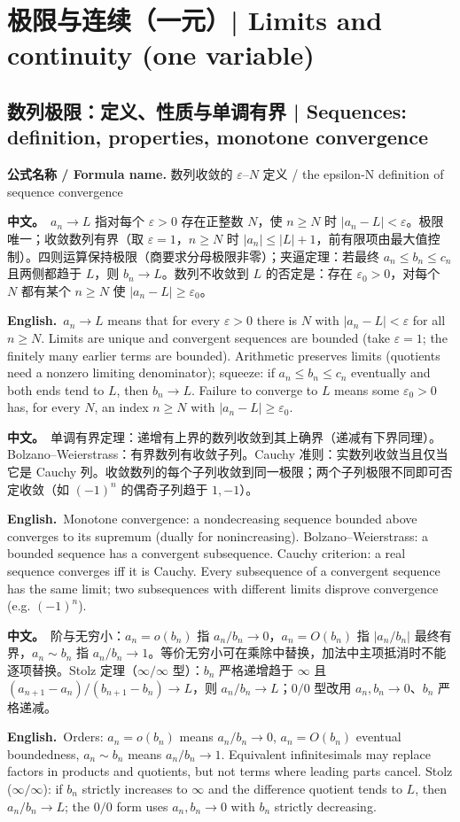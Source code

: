 \documentclass[UTF8,11pt,a4paper]{ctexart}
\newcommand{\BOTH}[2]{\par\noindent\textbf{中文。}\ #1\par\noindent\textbf{English.}\ #2\par}
\newcommand{\FORMULA}[2]{\par\noindent\textbf{公式名称 / Formula name.} #1 / #2\par}
\begin{document}
\section{极限与连续（一元）| Limits and continuity (one variable)}

\subsection{数列极限：定义、性质与单调有界 | Sequences: definition, properties, monotone convergence}
\FORMULA{数列收敛的 $\varepsilon$--$N$ 定义}{the epsilon-N definition of sequence convergence}
\BOTH{$a_n\to L$ 指对每个 $\varepsilon>0$ 存在正整数 $N$，使 $n\ge N$ 时 $|a_n-L|<\varepsilon$。极限唯一；收敛数列有界（取 $\varepsilon=1$，$n\ge N$ 时 $|a_n|\le|L|+1$，前有限项由最大值控制）。四则运算保持极限（商要求分母极限非零）；夹逼定理：若最终 $a_n\le b_n\le c_n$ 且两侧都趋于 $L$，则 $b_n\to L$。数列不收敛到 $L$ 的否定是：存在 $\varepsilon_0>0$，对每个 $N$ 都有某个 $n\ge N$ 使 $|a_n-L|\ge\varepsilon_0$。}{$a_n\to L$ means that for every $\varepsilon>0$ there is $N$ with $|a_n-L|<\varepsilon$ for all $n\ge N$. Limits are unique and convergent sequences are bounded (take $\varepsilon=1$; the finitely many earlier terms are bounded). Arithmetic preserves limits (quotients need a nonzero limiting denominator); squeeze: if $a_n\le b_n\le c_n$ eventually and both ends tend to $L$, then $b_n\to L$. Failure to converge to $L$ means some $\varepsilon_0>0$ has, for every $N$, an index $n\ge N$ with $|a_n-L|\ge\varepsilon_0$.}
\BOTH{单调有界定理：递增有上界的数列收敛到其上确界（递减有下界同理）。Bolzano--Weierstrass：有界数列有收敛子列。Cauchy 准则：实数列收敛当且仅当它是 Cauchy 列。收敛数列的每个子列收敛到同一极限；两个子列极限不同即可否定收敛（如 $(-1)^n$ 的偶奇子列趋于 $1,-1$）。}{Monotone convergence: a nondecreasing sequence bounded above converges to its supremum (dually for nonincreasing). Bolzano--Weierstrass: a bounded sequence has a convergent subsequence. Cauchy criterion: a real sequence converges iff it is Cauchy. Every subsequence of a convergent sequence has the same limit; two subsequences with different limits disprove convergence (e.g. $(-1)^n$).}
\BOTH{阶与无穷小：$a_n=o(b_n)$ 指 $a_n/b_n\to0$，$a_n=O(b_n)$ 指 $|a_n/b_n|$ 最终有界，$a_n\sim b_n$ 指 $a_n/b_n\to1$。等价无穷小可在乘除中替换，加法中主项抵消时不能逐项替换。Stolz 定理（$\infty/\infty$ 型）：$b_n$ 严格递增趋于 $\infty$ 且 $(a_{n+1}-a_n)/(b_{n+1}-b_n)\to L$，则 $a_n/b_n\to L$；$0/0$ 型改用 $a_n,b_n\to0$、$b_n$ 严格递减。}{Orders: $a_n=o(b_n)$ means $a_n/b_n\to0$, $a_n=O(b_n)$ eventual boundedness, $a_n\sim b_n$ means $a_n/b_n\to1$. Equivalent infinitesimals may replace factors in products and quotients, but not terms where leading parts cancel. Stolz ($\infty/\infty$): if $b_n$ strictly increases to $\infty$ and the difference quotient tends to $L$, then $a_n/b_n\to L$; the $0/0$ form uses $a_n,b_n\to0$ with $b_n$ strictly decreasing.}
\end{document}
